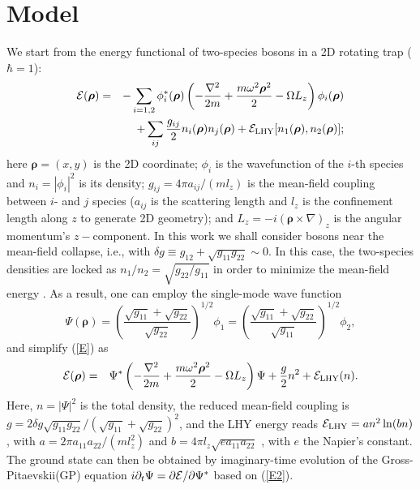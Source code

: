 \documentclass[reprint,aps,pra,twocolumn,superscriptaddress]{revtex4-1}
\begin{document}
\section{Model}
We start from the energy functional of two-species bosons in a 2D rotating trap ($\hbar=1$):
\begin{eqnarray}
\cal{E}(\bm{\rho})&=&-\sum_{i=1,2}  \phi_i^{*}(\bm{\rho})\left( -\frac{\nabla^2}{2m} + \frac{m\omega^2 \bm{\rho}^2}{2} - \Omega L_z\right) \phi_i(\bm{\rho}) \nonumber\\
&&+ \sum_{ij}\frac{g_{ij}}{2}n_i(\bm{\rho})n_j(\bm{\rho})+ {\cal E}_{\rm LHY}[n_1(\bm{\rho}),n_2(\bm{\rho})];\label{E}
\end{eqnarray}
here $\bm{\bm{\rho}}=(x,y)$ is the 2D coordinate; $\phi_i$ is the wavefunction of the $i$-th species and $n_i=|\phi_i|^2$ is its density; $g_{ij}=4\pi a_{ij}/(ml_z)$ is the mean-field coupling between $i$- and $j$ species ($a_{ij}$ is the scattering length and $l_z$ is the confinement length along $z$ to generate 2D geometry); and $L_z=-i (\bm{\rho}\times \nabla)_z $ is the angular momentum's $z-$component. In this work we shall consider bosons near the mean-field collapse, i.e., with $\delta g\equiv g_{12}+ \sqrt{g_{11}g_{22}}\sim 0$. In this case, the two-species densities are locked as $n_1/n_2=\sqrt{g_{22}/g_{11}}$ in order to minimize the mean-field energy \cite{Petrov2015}. As a result, one can employ the single-mode wave function
\begin{equation}
\Psi(\bm{\rho})=\left( \frac{\sqrt{g_{11}}+\sqrt{g_{22}}}{\sqrt{g_{22}}}\right)^{1/2} \phi_1 = \left( \frac{\sqrt{g_{11}}+\sqrt{g_{22}}}{\sqrt{g_{11}}}\right)^{1/2} \phi_2,
\end{equation}
and simplify (\ref{E}) as
\begin{eqnarray}
\cal{E}(\bm{\rho})&=&\Psi^{*}\left( -\frac{\nabla^2}{2m} + \frac{m\omega^2 \bm{\rho}^2}{2} - \Omega L_z\right)  \Psi + \frac{g}{2}n^2+ {\cal E}_{\rm LHY}(n). \nonumber\\ \label{E2}
\end{eqnarray}
Here, $n=|\Psi|^2$ is the total density, the reduced mean-field coupling is $g=2\delta g \sqrt{g_{11}g_{22}}/(\sqrt{g_{11}}+\sqrt{g_{22}})^2$, and the LHY energy reads ${\cal E}_{\rm LHY}=an^2 \ln(bn)$, with $a=2\pi a_{11}a_{22}/(ml_z^2)$ and $b=4\pi l_z \sqrt{ea_{11}a_{22}}$ \citep{Petrov_2, Zin}, with $e$ the Napier's constant. The ground state  can then be  obtained by imaginary-time evolution of the Gross-Pitaevskii(GP) equation $i\partial_t\Psi=\partial {\cal{E}}/\partial \Psi ^*$ based on (\ref{E2}). 
\end{document}

